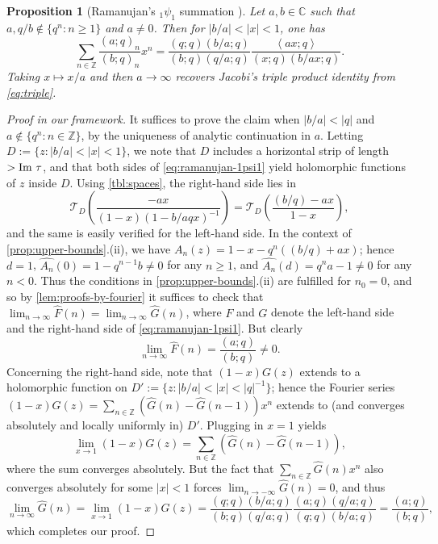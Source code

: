 \documentclass[reqno,11pt]{amsart}
\newtheorem{proposition}[theorem]{Proposition}
\theoremstyle{definition}
\theoremstyle{remark}
\numberwithin{equation}{section}
\newcommand{\Z}{\mathbb{Z}}
\newcommand{\C}{\mathbb{C}}
\newcommand{\mT}{\mathcal{T}}
\renewcommand{\Im}{\textnormal{Im}\ }
\newcommand{\la}{\left\langle}
\newcommand{\ra}{\right\rangle}
\renewcommand{\hat}{\widehat}
\begin{document}
\begin{proposition}[Ramanujan's $_1\psi_1$ summation \cite{warnaar2013ramanujan}] \label{prop:ramanujan-1psi1}
Let $a, b \in \C$ such that $a, q/b \not\in \{q^n : n \ge 1\}$ and $a \neq 0$. Then for $|b/a| < |x| < 1$, one has
\begin{equation} \label{eq:ramanujan-1psi1}
    \sum_{n \in \Z} 
    \frac{(a; q)_n}{(b; q)_n} x^n 
    =
    \frac{(q; q)(b/a; q)}{(b; q)(q/a; q)} \frac{\la ax; q \ra}{(x; q)(b/ax; q)}.
\end{equation}
Taking $x \mapsto x/a$ and then $a \to \infty$ recovers Jacobi's triple product identity from \cref{eq:triple}.
\end{proposition}
\begin{proof}[Proof in our framework]
It suffices to prove the claim when $|b/a| < |q|$ and $a \not \in \{q^n : n \in \Z\}$, by the uniqueness of analytic continuation in $a$. Letting $D := \{z : |b/a| < |x| < 1\}$, we note that $D$ includes a horizontal strip of length $> \Im \tau$, and that both sides of \cref{eq:ramanujan-1psi1} yield holomorphic functions of $z$ inside $D$. Using \cref{tbl:spaces}, the right-hand side lies in
\[
    \mT_D\left(\frac{-ax}{(1-x)(1-b/aqx)^{-1}} \right)
    =
    \mT_D\left(\frac{(b/q) - ax}{1-x}\right),
\]
and the same is easily verified for the left-hand side. In the context of \cref{prop:upper-bounds}.(ii), we have $A_n(z) = 1 - x - q^n((b/q) + ax)$; hence $d = 1$, $\hat{A_n}(0) = 1 - q^{n-1}b \neq 0$ for any $n \ge 1$, and $\hat{A_n}(d) = q^n a - 1 \neq 0$ for any $n < 0$. Thus the conditions in \cref{prop:upper-bounds}.(ii) are fulfilled for $n_0 = 0$, and so by \cref{lem:proofs-by-fourier} it suffices to check that $\lim_{n \to \infty} \hat{F}(n) = \lim_{n \to \infty} \hat{G}(n)$, where $F$ and $G$ denote the left-hand side and the right-hand side of \cref{eq:ramanujan-1psi1}. But clearly
\[
    \lim_{n \to \infty} \hat{F}(n) = \frac{(a; q)}{(b; q)} \neq 0.
\]
Concerning the right-hand side, note that $(1-x)G(z)$ extends to a holomorphic function on $D' := \{z : |b/a| < |x| < |q|^{-1}\}$; hence the Fourier series $(1-x)G(z) = \sum_{n \in \Z} \left(\hat{G}(n) - \hat{G}(n-1)\right) x^n$ extends to (and converges absolutely and locally uniformly in) $D'$. Plugging in $x = 1$ yields
\[
    \lim_{x \to 1} (1-x)G(z) 
    =
    \sum_{n \in \Z} \left(\hat{G}(n) - \hat{G}(n-1)\right),
\]
where the sum converges absolutely. But the fact that $\sum_{n \in \Z} \hat{G}(n) x^n$ also converges absolutely for some $|x| < 1$ forces $\lim_{n \to -\infty} \hat{G}(n) = 0$, and thus
\[
    \lim_{n \to \infty} \hat{G}(n) = \lim_{x \to 1} (1-x)G(z)
    =
    \frac{(q; q)(b/a; q)}{(b; q)(q/a; q)} \frac{(a; q)(q/a; q)}{(q; q)(b/a; q)}
    =
    \frac{(a; q)}{(b; q)},
\]
which completes our proof.
\end{proof}
\end{document}
